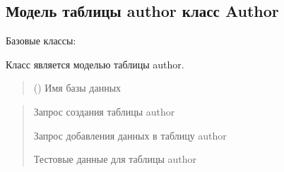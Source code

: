\documentclass[letterpaper,10pt,russian]{sphinxmanual}
\begin{document}
\subsection{Модель таблицы author \sphinxhyphen{} класс Author}
\label{\detokenize{database.sqlite3_interface.tables:module-database.sqlite3_interface.tables.author}}\label{\detokenize{database.sqlite3_interface.tables:author-author}}

\begin{fulllineitems}
\label{\detokenize{database.sqlite3_interface.tables:database.sqlite3_interface.tables.author.Author}}
\pysigstartsignatures
{}
\pysigstopsignatures
\sphinxAtStartPar
Базовые классы: {\hyperref[\detokenize{database.sqlite3_interface.tables:database.sqlite3_interface.tables.table.Table}]{}}

\sphinxAtStartPar
Класс является моделью таблицы author.
\begin{quote}\begin{description}
\sphinxAtStartPar
{} () \textendash{} Имя базы данных

\end{description}\end{quote}
\begin{description}
\begin{quote}\begin{description}
\sphinxAtStartPar
Запрос создания таблицы author

\sphinxAtStartPar
Запрос добавления данных в таблицу author

\sphinxAtStartPar
Тестовые данные для таблицы author


\end{description}
\end{quote}
\end{description}
\end{fulllineitems}
\end{document}
